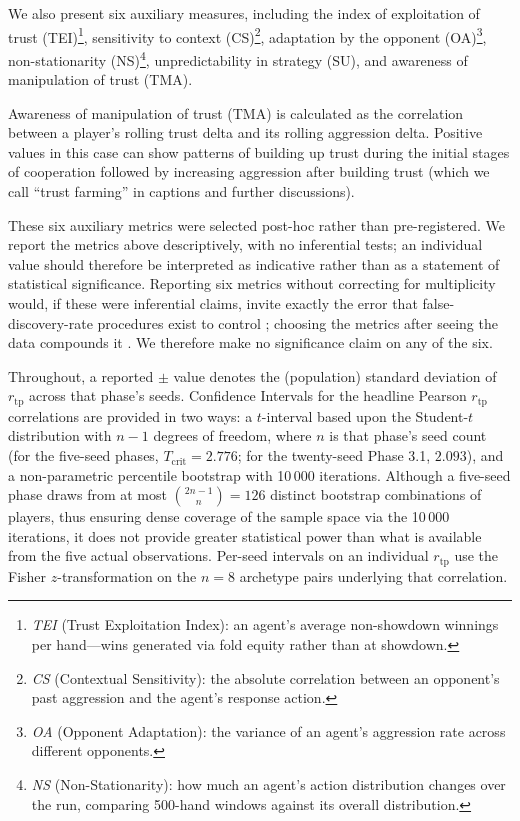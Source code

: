 \documentclass[journal]{IEEEtran}
\newcommand{\rtp}{\ensuremath{r_{\mathrm{tp}}}}
\begin{document}
We also present six auxiliary measures, including the index of
exploitation of trust (TEI)\footnote{\textit{TEI} (Trust Exploitation Index): an agent's average
non-showdown winnings per hand---wins generated via fold equity
rather than at showdown.},
sensitivity to context (CS)\footnote{\textit{CS} (Contextual Sensitivity): the absolute correlation
between an opponent's past aggression and the agent's response
action.}, adaptation by the opponent
(OA)\footnote{\textit{OA} (Opponent Adaptation): the variance of an agent's
aggression rate across different opponents.},
non-stationarity (NS)\footnote{\textit{NS} (Non-Stationarity): how much an agent's action
distribution changes over the run, comparing 500-hand windows against
its overall distribution.},
unpredictability in strategy (SU), and awareness of manipulation of
trust (TMA).

Awareness of manipulation of trust (TMA) is calculated as the
correlation between a player's rolling trust delta and its rolling
aggression delta. Positive values in this case can show patterns of
building up trust during the initial stages of cooperation followed
by increasing aggression after building trust (which we call ``trust
farming'' in captions and further discussions).

These six auxiliary metrics were selected post-hoc rather than
pre-registered. We report the metrics above descriptively, with no inferential
tests; an individual value should therefore be interpreted as
indicative rather than as a statement of statistical significance.
Reporting six metrics without correcting for multiplicity would, if
these were inferential claims, invite exactly the error that
false-discovery-rate procedures exist to control
\citep{benjamini1995controlling}; choosing the metrics after seeing
the data compounds it \citep{gelman2014statistical}. We therefore
make no significance claim on any of the six.

Throughout, a reported $\pm$ value denotes the (population) standard deviation of $\rtp$ across that phase's seeds. Confidence Intervals for the headline Pearson $\rtp$ correlations are provided in two ways: a $t$-interval based upon the Student-$t$ distribution with $n-1$ degrees of freedom, where $n$ is that phase's seed count (for the five-seed phases, $T_{\text{crit}} = 2.776$; for the twenty-seed Phase 3.1, $2.093$), and a non-parametric percentile bootstrap \citep{efron1979bootstrap} with 10\,000 iterations. Although a five-seed phase draws from at most $\binom{2n-1}{n} = 126$ distinct bootstrap combinations of players,
thus ensuring dense coverage of the sample space via the 10\,000
iterations, it does not provide greater statistical power than what
is available from the five actual observations. Per-seed intervals on an individual $\rtp$ use the Fisher $z$-transformation \citep{fisher1921probable} on the $n=8$ archetype pairs underlying that correlation.
\end{document}
